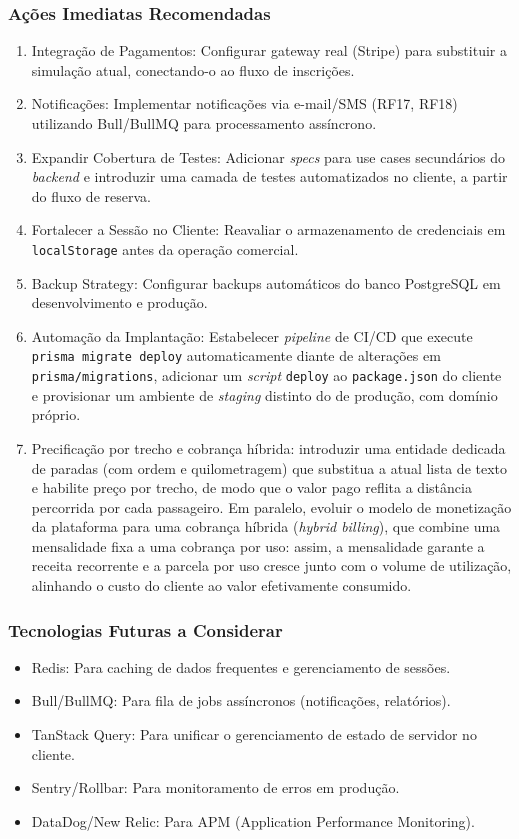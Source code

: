 \documentclass[12pt,openright,oneside,a4paper]{article}
\begin{document}
\subsubsection{Ações Imediatas Recomendadas}

\begin{enumerate}
\item Integração de Pagamentos: Configurar gateway real (Stripe) para substituir a simulação atual, conectando-o ao fluxo de inscrições.
\item Notificações: Implementar notificações via e-mail/SMS (RF17, RF18) utilizando Bull/BullMQ para processamento assíncrono.
\item Expandir Cobertura de Testes: Adicionar \textit{specs} para use cases secundários do \textit{backend} e introduzir uma camada de testes automatizados no cliente, a partir do fluxo de reserva.
\item Fortalecer a Sessão no Cliente: Reavaliar o armazenamento de credenciais em \texttt{localStorage} antes da operação comercial.
\item Backup Strategy: Configurar backups automáticos do banco PostgreSQL em desenvolvimento e produção.
\item Automação da Implantação: Estabelecer \textit{pipeline} de CI/CD que execute \texttt{prisma migrate deploy} automaticamente diante de alterações em \texttt{prisma/migrations}, adicionar um \textit{script} \texttt{deploy} ao \texttt{package.json} do cliente e provisionar um ambiente de \textit{staging} distinto do de produção, com domínio próprio.
\item Precificação por trecho e cobrança híbrida: introduzir uma entidade dedicada de paradas (com ordem e quilometragem) que substitua a atual lista de texto e habilite preço por trecho, de modo que o valor pago reflita a distância percorrida por cada passageiro. Em paralelo, evoluir o modelo de monetização da plataforma para uma cobrança híbrida (\textit{hybrid billing}), que combine uma mensalidade fixa a uma cobrança por uso: assim, a mensalidade garante a receita recorrente e a parcela por uso cresce junto com o volume de utilização, alinhando o custo do cliente ao valor efetivamente consumido.
\end{enumerate}

\subsubsection{Tecnologias Futuras a Considerar}

\begin{itemize}
\item Redis: Para caching de dados frequentes e gerenciamento de sessões.
\item Bull/BullMQ: Para fila de jobs assíncronos (notificações, relatórios).
\item TanStack Query: Para unificar o gerenciamento de estado de servidor no cliente.
\item Sentry/Rollbar: Para monitoramento de erros em produção.
\item DataDog/New Relic: Para APM (Application Performance Monitoring).
\end{itemize}
\end{document}
